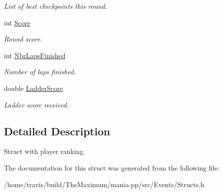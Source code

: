 \begin{DoxyCompactItemize}
\begin{DoxyCompactList}\small\item\em List of best checkpoints this round. \end{DoxyCompactList}\item 
\hypertarget{structPlayerRanking_a46cf9dd24b80841e9e21f9fec137bc05}{int \hyperlink{structPlayerRanking_a46cf9dd24b80841e9e21f9fec137bc05}{Score}}\label{structPlayerRanking_a46cf9dd24b80841e9e21f9fec137bc05}

\begin{DoxyCompactList}\small\item\em Round score. \end{DoxyCompactList}\item 
\hypertarget{structPlayerRanking_a82c1df4d6ef3d2dbb4ce8f654ef9f8b1}{int \hyperlink{structPlayerRanking_a82c1df4d6ef3d2dbb4ce8f654ef9f8b1}{Nbr\-Laps\-Finished}}\label{structPlayerRanking_a82c1df4d6ef3d2dbb4ce8f654ef9f8b1}

\begin{DoxyCompactList}\small\item\em Number of laps finished. \end{DoxyCompactList}\item 
\hypertarget{structPlayerRanking_a4b988897c8ab57fe04c3a1adfc908376}{double \hyperlink{structPlayerRanking_a4b988897c8ab57fe04c3a1adfc908376}{Ladder\-Score}}\label{structPlayerRanking_a4b988897c8ab57fe04c3a1adfc908376}

\begin{DoxyCompactList}\small\item\em Ladder score received. \end{DoxyCompactList}\end{DoxyCompactItemize}


\subsection{Detailed Description}
Struct with player ranking. 

The documentation for this struct was generated from the following file\-:\begin{DoxyCompactItemize}
\item 
/home/travis/build/\-The\-Maximum/mania-\/pp/src/\-Events/Structs.\-h\end{DoxyCompactItemize}
